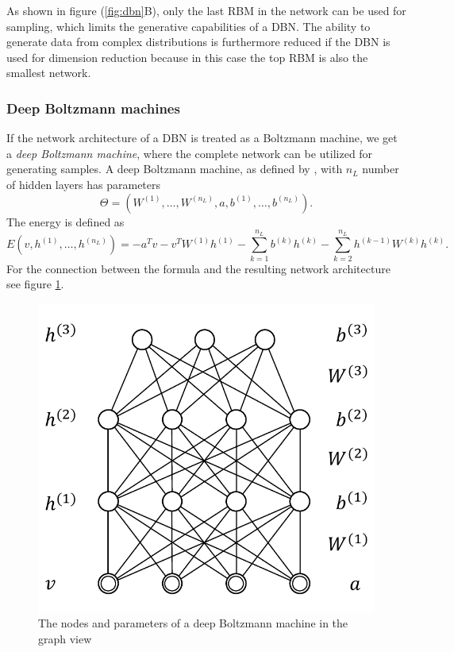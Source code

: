 \documentclass[12pt]{article}
\begin{document}
As shown in figure (\ref{fig:dbn}B), only the last RBM in the network can be used for sampling, which limits the generative capabilities of a DBN.
The ability to generate data from complex distributions is furthermore reduced if the DBN is used for dimension reduction because in this case the top RBM is also the smallest network.


\subsubsection{Deep Boltzmann machines}

If the network architecture of a DBN is treated as a Boltzmann machine, we get a \emph{deep Boltzmann machine}, where the complete network can be utilized for generating samples.
A deep Boltzmann machine, as defined by \cite{salakhutdinov2009DBMs}, with $n_L$ number of hidden layers has parameters 
\[
\Theta = \left (W^{(1)}, \dots, W^{(n_L)}, a, b^{(1)}, \dots, b^{(n_L)} \right).
\]
The energy is defined as 
\[
E(v, h^{(1)}, \dots, h^{(n_L)}) = - a^T v - v^T W^{(1)} h^{(1)} - \sum_{k=1}^{n_L} b^{(k)} h^{(k)} -  \sum_{k=2}^{n_L} h^{(k-1)}W^{(k)}h^{(k)}.
\]
For the connection between the formula and the resulting network architecture see figure  \ref{fig:dbmweights}.
\begin{figure}[h]
   \centering
   \includegraphics[scale=0.6]{images/dbmweights.pdf}
   \caption{The nodes and parameters of a deep Boltzmann machine in the graph view}
   \label{fig:dbmweights}
 \end{figure}
 
\end{document}
